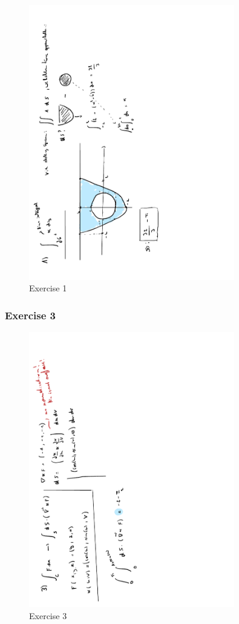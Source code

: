 \documentclass[a4paper]{report}
\begin{document}
\begin{figure}[H]
	\centering
	\includegraphics[angle=-90, width=0.8\textwidth]{assets/bord_7_ex_1.pdf}
	\caption{Exercise 1}
\end{figure}

\subsubsection{Exercise 3}

\begin{figure}[H]
	\centering
	\includegraphics[angle=-90, width=0.8\textwidth]{assets/bord_7_ex_3.pdf}
	\caption{Exercise 3}
\end{figure}
\end{document}
